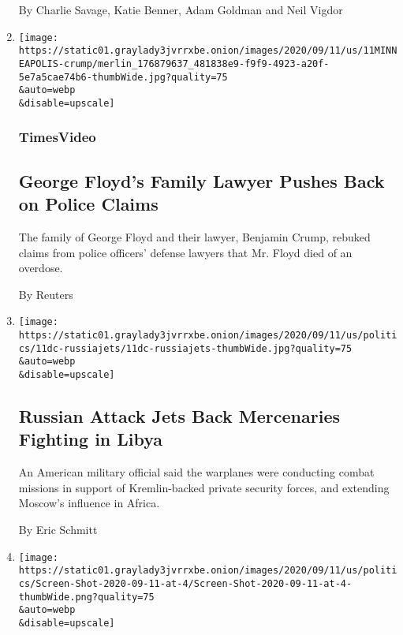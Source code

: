 \begin{enumerate}
  By Charlie Savage, Katie Benner, Adam Goldman and Neil Vigdor
\item
  \href{/video/us/politics/100000007336889/geroge-floyd-ben-crump-overdose.html}{}

  \texttt{[image: https://static01.graylady3jvrrxbe.onion/images/2020/09/11/us/11MINNEAPOLIS-crump/merlin\_176879637\_481838e9-f9f9-4923-a20f-5e7a5cae74b6-thumbWide.jpg?quality=75\\\&auto=webp\\\&disable=upscale]}

  \hypertarget{timesvideo}{%
  \subsubsection{TimesVideo}\label{timesvideo}}

  \hypertarget{george-floyds-family-lawyer-pushes-back-on-police-claims}{%
  \subsection{George Floyd's Family Lawyer Pushes Back on Police
  Claims}\label{george-floyds-family-lawyer-pushes-back-on-police-claims}}

  The family of George Floyd and their lawyer, Benjamin Crump, rebuked
  claims from police officers' defense lawyers that Mr. Floyd died of an
  overdose.

  By Reuters
\item
  \href{/2020/09/11/us/politics/russian-jets-mercenaries-libya.html}{}

  \texttt{[image: https://static01.graylady3jvrrxbe.onion/images/2020/09/11/us/politics/11dc-russiajets/11dc-russiajets-thumbWide.jpg?quality=75\\\&auto=webp\\\&disable=upscale]}

  \hypertarget{russian-attack-jets-back-mercenaries-fighting-in-libya}{%
  \subsection{Russian Attack Jets Back Mercenaries Fighting in
  Libya}\label{russian-attack-jets-back-mercenaries-fighting-in-libya}}

  An American military official said the warplanes were conducting
  combat missions in support of Kremlin-backed private security forces,
  and extending Moscow's influence in Africa.

  By Eric Schmitt
\item
  \href{/video/us/politics/100000007336611/newsom-wildfires-california-death-toll.html}{}

  \texttt{[image: https://static01.graylady3jvrrxbe.onion/images/2020/09/11/us/politics/Screen-Shot-2020-09-11-at-4/Screen-Shot-2020-09-11-at-4-thumbWide.png?quality=75\\\&auto=webp\\\&disable=upscale]}


\end{enumerate}
